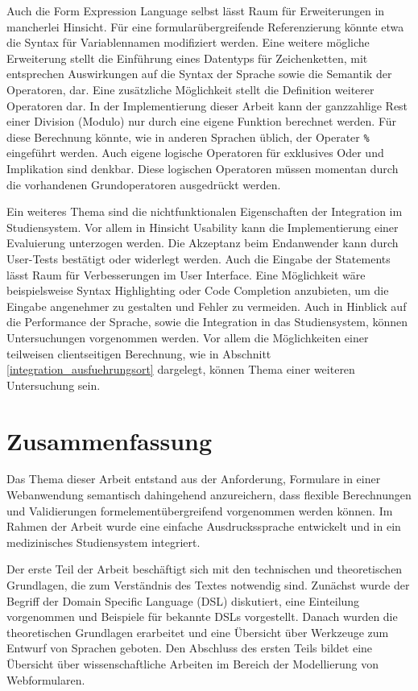 Auch die Form Expression Language selbst lässt Raum für Erweiterungen in mancherlei Hinsicht. Für eine formularübergreifende Referenzierung könnte etwa die Syntax für Variablennamen modifiziert werden. Eine weitere mögliche Erweiterung stellt die Einführung eines Datentyps für Zeichenketten, mit entsprechen Auswirkungen auf die Syntax der Sprache sowie die Semantik der Operatoren, dar. Eine zusätzliche Möglichkeit stellt die Definition weiterer Operatoren dar. In der Implementierung dieser Arbeit kann der ganzzahlige Rest einer Division (Modulo) nur durch eine eigene Funktion berechnet werden. Für diese Berechnung könnte, wie in anderen Sprachen üblich, der Operater \texttt{\%} eingeführt werden. Auch eigene logische Operatoren für exklusives Oder und Implikation sind denkbar. Diese logischen Operatoren müssen momentan durch die vorhandenen Grundoperatoren ausgedrückt werden.

Ein weiteres Thema sind die nichtfunktionalen Eigenschaften der Integration im Studiensystem. Vor allem in Hinsicht Usability kann die Implementierung einer Evaluierung unterzogen werden. Die Akzeptanz beim Endanwender kann durch User-Tests bestätigt oder widerlegt werden. Auch die Eingabe der Statements lässt Raum für Verbesserungen im User Interface. Eine Möglichkeit wäre beispielsweise Syntax Highlighting oder Code Completion anzubieten, um die Eingabe angenehmer zu gestalten und Fehler zu vermeiden. Auch in Hinblick auf die Performance der Sprache, sowie die Integration in das Studiensystem, können Untersuchungen vorgenommen werden. Vor allem die Möglichkeiten einer teilweisen clientseitigen Berechnung, wie in Abschnitt \ref{integration_ausfuehrungsort} dargelegt, können Thema einer weiteren Untersuchung sein.

\chapter{Zusammenfassung}
\label{chapter_zusammenfassung}

Das Thema dieser Arbeit entstand aus der Anforderung, Formulare in einer Webanwendung semantisch dahingehend anzureichern, dass flexible Berechnungen und Validierungen formelementübergreifend vorgenommen werden können. Im Rahmen der Arbeit wurde eine einfache Ausdruckssprache entwickelt und in ein medizinisches Studiensystem integriert.

Der erste Teil der Arbeit beschäftigt sich mit den technischen und theoretischen Grundlagen, die zum Verständnis des Textes notwendig sind. Zunächst wurde der Begriff der Domain Specific Language (DSL) diskutiert, eine Einteilung vorgenommen und Beispiele für bekannte DSLs vorgestellt. Danach wurden die theoretischen Grundlagen erarbeitet und eine Übersicht über Werkzeuge zum Entwurf von Sprachen geboten. Den Abschluss des ersten Teils bildet eine Übersicht über wissenschaftliche Arbeiten im Bereich der Modellierung von Webformularen.

